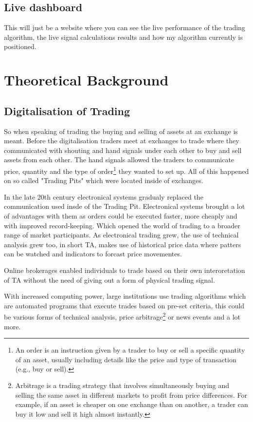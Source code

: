\documentclass[12pt]{article}
\begin{document}
\subsection{Live dashboard}
This will just be a website where you can see the live performance of the trading algorithm, the live signal calculations results and how my algorithm currently is positioned.



\newpage

\section{Theoretical Background}
\subsection{Digitalisation of Trading}
So when speaking of trading the buying and selling of assets at an exchange is meant. Before the digitalisation traders meet at exchanges to trade where they communicated with shouting and hand signals under each other to buy and sell assets from each other. The hand signals allowed the traders to communicate price, quantity and the type of order\footnote{An order is an instruction given by a trader to buy or sell a specific quantity of an asset, usually including details like the price and type of transaction (e.g., buy or sell).}
they wanted to set up.  All of this happened on so called "Trading Pits" which were located inside of exchanges.


In the late 20th century electronical systems gradualy replaced the communication used insde of the Trading Pit. Electronical systems brought a lot of advantages with them as orders could be executed faster, more cheaply and with improved record-keeping. Which opened the world of trading to a broader range of market participants. 
As electronical trading grew, the use of technical analysis grew too, in short TA, makes use of historical price data where patters can be watched and indicators to forcast price movementes.

Online brokerages enabled individuals to trade based on their own interoretation of TA without the need of giving out a form of physical trading signal.

With increased computing power, large institutions use trading algorithms which are automated programs that execute trades based on pre-set criteria, this could be various forms of technical analysis, price arbitrage\footnote{Arbitrage is a trading strategy that involves simultaneously buying and selling the same asset in different markets to profit from price differences. For example, if an asset is cheaper on one exchange than on another, a trader can buy it low and sell it high almost instantly.} or news events and a lot more.
\end{document}
